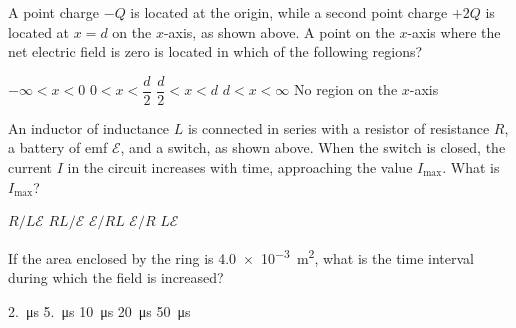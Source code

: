 \documentclass[12pt]{../oss-classkick-exam}
\begin{document}
\begin{questions}
  \question A point charge $-Q$ is located at the origin, while a second point
  charge $+2Q$ is located at $x=d$ on the $x$-axis, as shown above. A point on
  the $x$-axis where the net electric field is zero is located in which of the
  following regions?
  \begin{choices}
    \choice $-\infty<x<0$
    \choice $0<x<\dfrac{d}2$
    \choice $\dfrac{d}2<x<d$
    \choice $d<x<\infty$
    \choice No region on the $x$-axis
  \end{choices}
  
  \question An inductor of inductance $L$ is connected in series with a
  resistor of resistance $R$, a battery of emf $\mathcal E$, and a switch, as
  shown above. When the switch is closed, the current $I$ in the circuit
  increases with time, approaching the value $I_\text{max}$. What is
  $I_\text{max}$?
  \begin{choices}
    \choice $R/L\mathcal E$
    \choice $RL/\mathcal E$
    \choice $\mathcal E/RL$
    \choice $\mathcal E/R$
    \choice $L\mathcal E$
  \end{choices}
  \newpage
  
  
  \question If the area enclosed by the ring is \SI{4.0e-3}{\metre\squared},
  what is the time interval during which the field is increased?
  \label{emf1}
  \begin{choices}
    \choice \SI{2.}{\micro\second}\hspace{.3in}
    \choice \SI{5.}{\micro\second}\hspace{.3in}
    \choice \SI{10}{\micro\second}\hspace{.3in}
    \choice \SI{20}{\micro\second}\hspace{.3in}
    \choice \SI{50}{\micro\second}
  \end{choices}


\end{questions}
\end{document}
